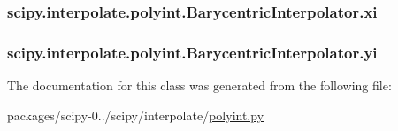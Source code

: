 \subsubsection[{xi}]{\setlength{\rightskip}{0pt plus 5cm}scipy.\+interpolate.\+polyint.\+Barycentric\+Interpolator.\+xi}\label{classscipy_1_1interpolate_1_1polyint_1_1BarycentricInterpolator_aaf509dcc7e95b9d62ad7fd5bdda71b5c}
\hypertarget{classscipy_1_1interpolate_1_1polyint_1_1BarycentricInterpolator_a781d8036afd2720c35382b19bbdf1b1d}{}
\subsubsection[{yi}]{\setlength{\rightskip}{0pt plus 5cm}scipy.\+interpolate.\+polyint.\+Barycentric\+Interpolator.\+yi}\label{classscipy_1_1interpolate_1_1polyint_1_1BarycentricInterpolator_a781d8036afd2720c35382b19bbdf1b1d}


The documentation for this class was generated from the following file\+:\begin{DoxyCompactItemize}
\item 
packages/scipy-\/0../scipy/interpolate/\hyperlink{polyint_8py}{polyint.\+py}\end{DoxyCompactItemize}
